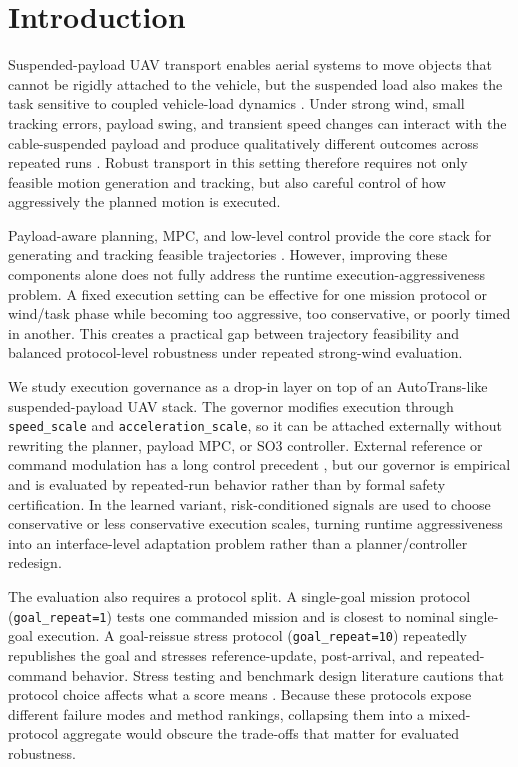 \section{Introduction}

Suspended-payload UAV transport enables aerial systems to move objects that
cannot be rigidly attached to the vehicle, but the suspended load also makes
the task sensitive to coupled vehicle-load dynamics
\cite{Sreenath2013DifferentiallyFlatHybrid,Li2023AutoTrans}. Under strong wind,
small tracking errors, payload swing, and transient speed changes can interact
with the cable-suspended payload and produce qualitatively different outcomes
across repeated runs \cite{Son2020ObstacleAvoidanceSuspendedLoad,GuerreroSanchez2017SwingAttenuation}.
Robust transport in this setting therefore requires not only feasible motion
generation and tracking, but also careful control of how aggressively the
planned motion is executed.

Payload-aware planning, MPC, and low-level control provide the core stack for
generating and tracking feasible trajectories
\cite{Li2023AutoTrans,Son2020ObstacleAvoidanceSuspendedLoad,UrbinaBrito2021PredictivePayloadTransport,Lee2010GeometricTrackingSE3}.
However, improving these components alone does not fully address the runtime
execution-aggressiveness problem. A fixed execution setting can be effective
for one mission protocol or wind/task phase while becoming too aggressive, too
conservative, or poorly timed in another. This creates a practical gap between
trajectory feasibility and balanced protocol-level robustness under repeated
strong-wind evaluation.

We study execution governance as a drop-in layer on top of an AutoTrans-like
suspended-payload UAV stack. The governor modifies execution through
\texttt{speed\_scale} and \texttt{acceleration\_scale}, so it can be attached
externally without rewriting the planner, payload MPC, or SO3 controller.
External reference or command modulation has a long control precedent
\cite{Garone2017ReferenceCommandGovernorsSurvey,Garone2016ExplicitReferenceGovernor,Li2021ActionGovernor},
but our governor is empirical and is evaluated by repeated-run behavior rather
than by formal safety certification. In the learned variant, risk-conditioned
signals are used to choose conservative or less conservative execution scales,
turning runtime aggressiveness into an interface-level adaptation problem
rather than a planner/controller redesign.

The evaluation also requires a protocol split. A single-goal mission protocol
(\texttt{goal\_repeat=1}) tests one commanded mission and is closest to nominal
single-goal execution. A goal-reissue stress protocol
(\texttt{goal\_repeat=10}) repeatedly republishes the goal and stresses
reference-update, post-arrival, and repeated-command behavior. Stress testing
and benchmark design literature cautions that protocol choice affects what a
score means \cite{Koren2018AdaptiveStressTesting,Nalic2020StressTestingScenarioBasedADS,Muller2019MeasureTargetConfusion}.
Because these protocols expose different failure modes and method rankings,
collapsing them into a mixed-protocol aggregate would obscure the trade-offs
that matter for evaluated robustness.

